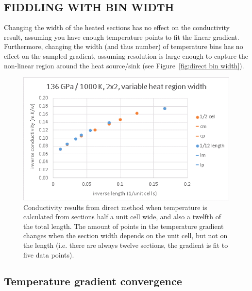 \pagebreak

\subsection{\label{sec:3.DM.bin}FIDDLING WITH BIN WIDTH}

Changing the width of the heated sections has no effect on the conductivity result, assuming you have enough temperature points to fit the linear gradient. Furthermore, changing the width (and thus number) of temperature bins has no effect on the sampled gradient, assuming resolution is large enough to capture the non-linear region around the heat source/sink (see Figure~\ref{fig:direct bin width}).

\begin{figure}[h!]
\includegraphics[width=\linewidth]{Figures/direct_bin_width.png}
\caption[direct bin width]{Conductivity results from direct method when temperature is calculated from sections half a unit cell wide, and also a twelfth of the total length. The amount of points in the temperature gradient changes when the section width depends on the unit cell, but not on the length (i.e. there are always twelve sections, the gradient is fit to five data points).}
\label{fig:direct_bin_width}
\end{figure}

\pagebreak

\subsection{\label{sec:3.DM.grad}Temperature gradient convergence}

